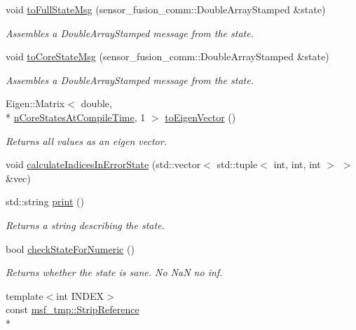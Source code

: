 \begin{DoxyCompactItemize}
void \hyperlink{structmsf__core_1_1GenericState__T_ab987d5916f3b7ab394539b46a9d5fabb}{to\-Full\-State\-Msg} (sensor\-\_\-fusion\-\_\-comm\-::\-Double\-Array\-Stamped \&state)
\begin{DoxyCompactList}\small\item\em Assembles a Double\-Array\-Stamped message from the state. \end{DoxyCompactList}\item 
void \hyperlink{structmsf__core_1_1GenericState__T_a284c9a13e909d3a1d0d3d012e3445542}{to\-Core\-State\-Msg} (sensor\-\_\-fusion\-\_\-comm\-::\-Double\-Array\-Stamped \&state)
\begin{DoxyCompactList}\small\item\em Assembles a Double\-Array\-Stamped message from the state. \end{DoxyCompactList}\item 
Eigen\-::\-Matrix$<$ double, \\*
\hyperlink{structmsf__core_1_1GenericState__T_a20545d9aacd8f84bc1a97a873310cd5fabd9ce322dcc236ba424c7435e37a34f3}{n\-Core\-States\-At\-Compile\-Time}, 1 $>$ \hyperlink{structmsf__core_1_1GenericState__T_a03efdc4aaadaf38d3beed4ed013c73a3}{to\-Eigen\-Vector} ()
\begin{DoxyCompactList}\small\item\em Returns all values as an eigen vector. \end{DoxyCompactList}\item 
void \hyperlink{structmsf__core_1_1GenericState__T_aa9b0416f9a69c5dc7a2be0f36a911e3b}{calculate\-Indices\-In\-Error\-State} (std\-::vector$<$ std\-::tuple$<$ int, int, int $>$ $>$ \&vec)
\item 
std\-::string \hyperlink{structmsf__core_1_1GenericState__T_a1b9703f4f0c7e9fe930808893626e6ef}{print} ()
\begin{DoxyCompactList}\small\item\em Returns a string describing the state. \end{DoxyCompactList}\item 
bool \hyperlink{structmsf__core_1_1GenericState__T_ac540479ddebda9d50e3329b1e652eefe}{check\-State\-For\-Numeric} ()
\begin{DoxyCompactList}\small\item\em Returns whether the state is sane. No Na\-N no inf. \end{DoxyCompactList}\item 
{\footnotesize template$<$int I\-N\-D\-E\-X$>$ }\\const \hyperlink{structmsf__tmp_1_1StripReference}{msf\-\_\-tmp\-::\-Strip\-Reference}\\*

\end{DoxyCompactItemize}
